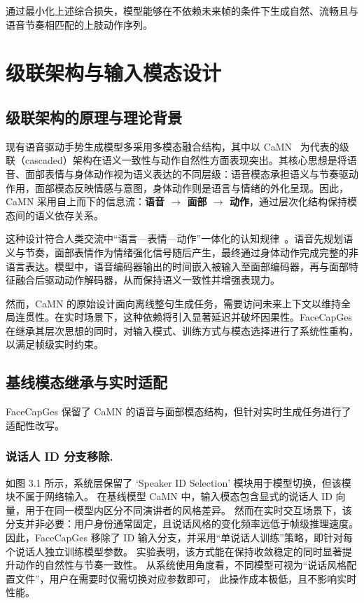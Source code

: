 通过最小化上述综合损失，模型能够在不依赖未来帧的条件下生成自然、流畅且与语音节奏相匹配的上肢动作序列。

\section{级联架构与输入模态设计}
\label{sec:input_encoding}

\subsection{级联架构的原理与理论背景}

现有语音驱动手势生成模型多采用多模态融合结构，其中以 CaMN~\cite{liu2022beat} 为代表的级联（cascaded）架构在语义一致性与动作自然性方面表现突出。其核心思想是将语音、面部表情与身体动作视为语义表达的不同层级：语音模态承担语义与节奏驱动作用，面部模态反映情感与意图，身体动作则是语言与情绪的外化呈现。因此，CaMN 采用自上而下的信息流：\textbf{语音 $\rightarrow$ 面部 $\rightarrow$ 动作}，通过层次化结构保持模态间的语义依存关系。

这种设计符合人类交流中“语言—表情—动作”一体化的认知规律~\cite{mcneill1992hand,kendon2004gesture}。语音先规划语义与节奏，面部表情作为情绪强化信号随后产生，最终通过身体动作完成完整的非语言表达。模型中，语音编码器输出的时间嵌入被输入至面部编码器，再与面部特征融合后驱动动作解码器，从而保持语义一致性并增强表现力。

然而，CaMN 的原始设计面向离线整句生成任务，需要访问未来上下文以维持全局连贯性。在实时场景下，这种依赖将引入显著延迟并破坏因果性。FaceCapGes 在继承其层次思想的同时，对输入模式、训练方式与模态选择进行了系统性重构，以满足帧级实时约束。

\subsection{基线模态继承与实时适配}
FaceCapGes 保留了 CaMN 的语音与面部模态结构，但针对实时生成任务进行了适配性改写。

\subsubsection{说话人 ID 分支移除.}
如图 3.1 所示，系统层保留了 ‘Speaker ID Selection’ 模块用于模型切换，但该模块不属于网络输入。
在基线模型 CaMN 中，输入模态包含显式的说话人 ID 向量，用于在同一模型内区分不同演讲者的风格差异。
然而在实时交互场景下，该分支并非必要：用户身份通常固定，且说话风格的变化频率远低于帧级推理速度。
因此，FaceCapGes 移除了 ID 输入分支，并采用“单说话人训练”策略，即针对每个说话人独立训练模型参数。
实验表明，该方式能在保持收敛稳定的同时显著提升动作的自然性与节奏一致性。
从系统使用角度看，不同模型可视为“说话风格配置文件”，用户在需要时仅需切换对应参数即可，
此操作成本极低，且不影响实时性能。

